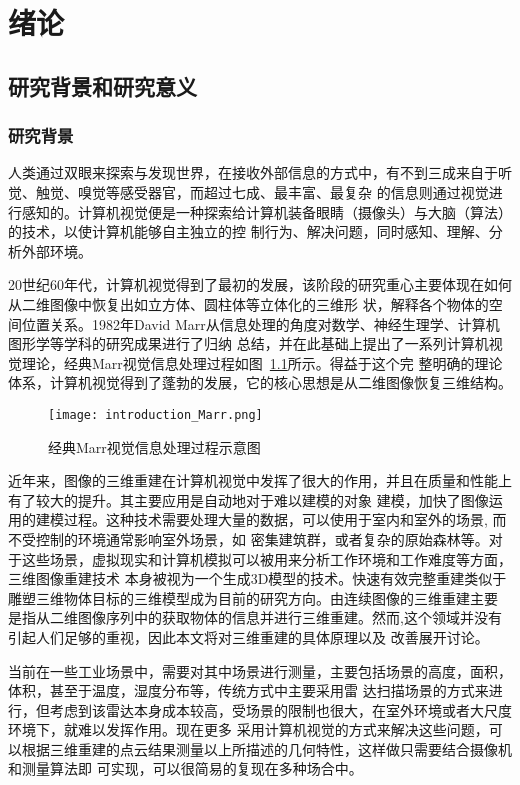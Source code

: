 \chapter{绪论}
\label{cha:chap1}
\section{研究背景和研究意义}
\label{sec:1.1}
\subsection{研究背景}
\label{sec:1.1.1}
人类通过双眼来探索与发现世界，在接收外部信息的方式中，有不到三成来自于听觉、触觉、嗅觉等感受器官，而超过七成、最丰富、最复杂
的信息则通过视觉进行感知的。计算机视觉便是一种探索给计算机装备眼睛（摄像头）与大脑（算法）的技术，以使计算机能够自主独立的控
制行为、解决问题，同时感知、理解、分析外部环境。

20世纪60年代，计算机视觉得到了最初的发展，该阶段的研究重心主要体现在如何从二维图像中恢复出如立方体、圆柱体等立体化的三维形
状，解释各个物体的空间位置关系。1982年David Marr从信息处理的角度对数学、神经生理学、计算机图形学等学科的研究成果进行了归纳
总结，并在此基础上提出了一系列计算机视觉理论，经典Marr视觉信息处理过程如图~\ref{fig:introduction_Marr}所示。得益于这个完
整明确的理论体系，计算机视觉得到了蓬勃的发展，它的核心思想是从二维图像恢复三维结构。
\begin{figure}[H] %
  \centering
  \texttt{[image: introduction\_Marr.png]}
  \caption{经典Marr视觉信息处理过程示意图}
  \label{fig:introduction_Marr}
\end{figure}
近年来，图像的三维重建在计算机视觉中发挥了很大的作用，并且在质量和性能上有了较大的提升。其主要应用是自动地对于难以建模的对象
建模，加快了图像运用的建模过程。这种技术需要处理大量的数据，可以使用于室内和室外的场景, 而不受控制的环境通常影响室外场景，如
密集建筑群，或者复杂的原始森林等。对于这些场景，虚拟现实和计算机模拟可以被用来分析工作环境和工作难度等方面，三维图像重建技术
本身被视为一个生成3D模型的技术。快速有效完整重建类似于雕塑三维物体目标的三维模型成为目前的研究方向。由连续图像的三维重建主要
是指从二维图像序列中的获取物体的信息并进行三维重建。然而,这个领域并没有引起人们足够的重视，因此本文将对三维重建的具体原理以及
改善展开讨论。

当前在一些工业场景中，需要对其中场景进行测量，主要包括场景的高度，面积，体积，甚至于温度，湿度分布等，传统方式中主要采用雷
达扫描场景的方式来进行，但考虑到该雷达本身成本较高，受场景的限制也很大，在室外环境或者大尺度环境下，就难以发挥作用。现在更多
采用计算机视觉的方式来解决这些问题，可以根据三维重建的点云结果测量以上所描述的几何特性，这样做只需要结合摄像机和测量算法即
可实现，可以很简易的复现在多种场合中。
